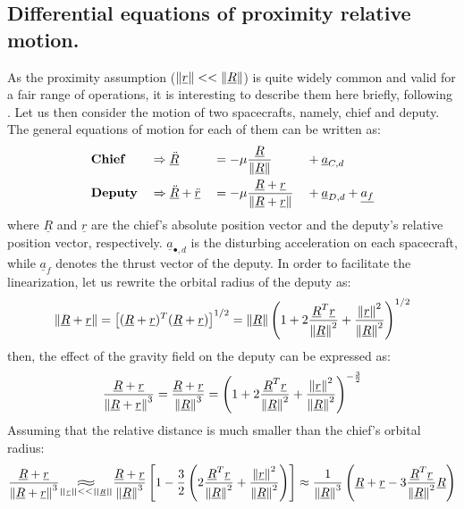 	\subsection{Differential equations of proximity relative motion.} \label{sec: Diff_eqs_prox}
	\indent As the proximity assumption ($\mbox{$\left\lVert \underline{r} \right\rVert$} <<\mbox{$\left\lVert \underline{R} \right\rVert$}$) is quite widely common and valid for a fair range of operations, it is interesting to describe them here briefly, following \cite{Yamanaka_ankersen}. Let us then consider the motion of two spacecrafts, namely, chief and deputy. The general equations of motion for each of them can be written as:
	\begin{alignat}{4}
	&\textbf{Chief} 		&& \Rightarrow   \underline{\ddot{R}}   && = - \mu \dfrac{\underline{R}}{\mbox{$\left\lVert \underline{R} \right\rVert$}} &&+ \underline{a}_{C, d} \label{eqCh2:chief_eq} \\
	&\textbf{Deputy} 		&& \Rightarrow   \underline{\ddot{R}} + \underline{\ddot{r}}  && =  - \mu \dfrac{\underline{R} + \underline{r}}{\mbox{$\left\lVert \underline{R} + \underline{r} \right\rVert$}} && + \underline{a}_{D, d} + \underline{a_f}  \label{eqCh2:deputy_eq}
	\end{alignat}
	\noindent where $\underline{R}$ and $\underline{r}$ are the chief's absolute position vector and the deputy's relative position vector, respectively. $\underline{a}_{\bullet, d}$ is the disturbing acceleration on each spacecraft, while $\underline{a}_f$ denotes the thrust vector of the deputy. In order to facilitate the linearization, let us rewrite the orbital radius of the deputy as:
	\[
	\mbox{$\left\lVert \underline{R} + \underline{r} \right\rVert$} = \left[ (\underline{R} + \underline{r})^T (\underline{R} + \underline{r}) \right]^{1/2} = \mbox{$\left\lVert \underline{R} \right\rVert$} \left( 1 + 2 \dfrac{\underline{R}^T \underline{r}}{\mbox{$\left\lVert \underline{R} \right\rVert$}^2} + \dfrac{\mbox{$\left\lVert \underline{r} \right\rVert$}^2}{\mbox{$\left\lVert \underline{R} \right\rVert$}^2} \right)^{1/2}
	\]
	\noindent then, the effect of the gravity field on the deputy can be expressed as:
	\[
	\dfrac{\underline{R} + \underline{r}}{\mbox{$\left\lVert \underline{R} + \underline{r} \right\rVert$}^{3}} = \dfrac{\underline{R} + \underline{r}}{\mbox{$\left\lVert \underline{R} \right\rVert$}^{3}} = \left( 1 + 2 \dfrac{\underline{R}^T \underline{r}}{\mbox{$\left\lVert \underline{R} \right\rVert$}^2} + \dfrac{\mbox{$\left\lVert \underline{r} \right\rVert$}^2}{\mbox{$\left\lVert \underline{R} \right\rVert$}^2} \right)^{-\frac{3}{2}}
	\]
	\indent Assuming that the relative distance is much smaller than the chief's orbital radius:
	\begin{equation}
	\dfrac{\underline{R} + \underline{r}}{\norm{\underline{R} + \underline{r}}^{3}} \underset{\tiny{\norm{\underline{r}} << \norm{\underline{R}}}}{\longapprox} \dfrac{\underline{R} + \underline{r}}{\norm{\underline{R}}^{3}} \left[1 - \frac{3}{2} \left( 2 \dfrac{\underline{R}^T \underline{r}}{\norm{\underline{R}}^2} + \dfrac{\norm{\underline{r}}^2}{\norm{\underline{R}}^2} \right) \right] \approx  \dfrac{1}{\norm{\underline{R}}^{3}} \left(\underline{R} + \underline{r} - 3 \dfrac{\underline{R}^T \underline{r}}{\norm{\underline{R}}^2} \underline{R} \right)
	\label{eqCh2: 	Rplusr}
	\end{equation}
